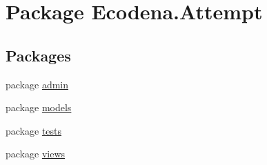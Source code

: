 \hypertarget{namespace_ecodena_1_1_attempt}{
\section{Package Ecodena.Attempt}
\label{d5/dca/namespace_ecodena_1_1_attempt}
}
\subsection*{Packages}
\begin{DoxyCompactItemize}
\item 
package \hyperlink{namespace_ecodena_1_1_attempt_1_1admin}{admin}
\item 
package \hyperlink{namespace_ecodena_1_1_attempt_1_1models}{models}
\item 
package \hyperlink{namespace_ecodena_1_1_attempt_1_1tests}{tests}
\item 
package \hyperlink{namespace_ecodena_1_1_attempt_1_1views}{views}
\end{DoxyCompactItemize}

